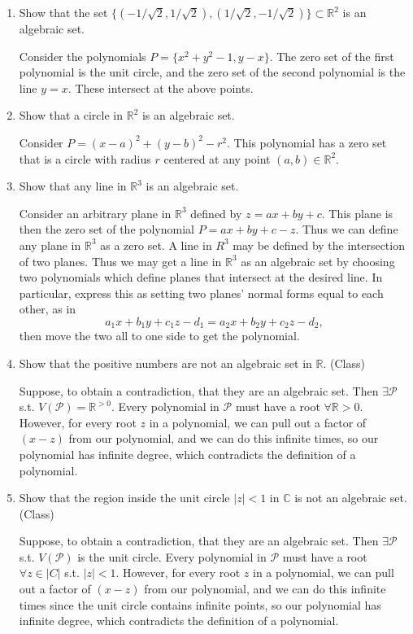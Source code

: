 \documentclass[12pt]{article}
\newcommand{\R}{\mathbb{R}}
\newcommand{\C}{\mathbb{C}}
\begin{document}
\begin{enumerate}
\begin{enumerate}
    \item Show that the set $\{(-1/\sqrt{2}, 1/\sqrt{2}), (1/\sqrt{2}, -1/\sqrt{2})\} \subset \R^2$ is an algebraic set.
    
    Consider the polynomials $P=\{x^2+y^2-1, y-x\}$.  The zero set of the first polynomial is the unit circle, and the zero set of the second polynomial is the line $y=x$.  These intersect at the above points.
    
    \item Show that a circle in $\R^2$ is an algebraic set.
    
    Consider $P=(x-a)^2 + (y-b)^2 -r^2$.  This polynomial has a zero set that is a circle with radius $r$ centered at any point $(a,b)\in \R^2$.
    
    \item Show that any line in $\R^3$ is an algebraic set.
    
    Consider an arbitrary plane in $\R^3$ defined by $z=ax+by+c$.  This plane is then the zero set of the polynomial $P=ax+by+c-z$.  Thus we can define any plane in $\R^3$ as a zero set.  A line in $R^3$ may be defined by the intersection of two planes.  Thus we may get a line in $\R^3$ as an algebraic set by choosing two polynomials which define planes that intersect at the desired line.  In particular, express this as setting two planes' normal forms equal to each other, as in
    \[a_1x+b_1y+c_1z-d_1 = a_2x+b_2y+c_2z-d_2,\]
    then move the two all to one side to get the polynomial.
    
    \item Show that the positive numbers are not an algebraic set in $\R$. (Class)
    
	Suppose, to obtain a contradiction, that they are an algebraic set.  Then $\exists \mathcal{P}$ s.t. $V(\mathcal{P}) = \R^{>0}$.  Every polynomial in $\mathcal{P}$ must have a root $\forall \R >0$.  However, for every root $z$ in a polynomial, we can pull out a factor of $(x-z)$ from our polynomial, and we can do this infinite times, so our polynomial has infinite degree, which contradicts the definition of a polynomial.
    
    \item Show that the region inside the unit circle $|z|<1$ in $\C$ is not an algebraic set. (Class)
    
    Suppose, to obtain a contradiction, that they are an algebraic set.  Then $\exists \mathcal{P}$ s.t. $V(\mathcal{P})$ is the unit circle.  Every polynomial in $\mathcal{P}$ must have a root $\forall z\in |C|$ s.t. $|z|<1$.  However, for every root $z$ in a polynomial, we can pull out a factor of $(x-z)$ from our polynomial, and we can do this infinite times since the unit circle contains infinite points, so our polynomial has infinite degree, which contradicts the definition of a polynomial.
    

\end{enumerate}
\end{enumerate}
\end{document}
